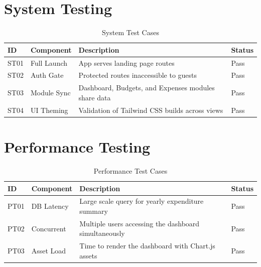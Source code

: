 \section{System Testing}
\begin{longtable}{|l|l|p{4cm}|l|}
\caption{System Test Cases} \\
\hline
\textbf{ID} & \textbf{Component} & \textbf{Description} & \textbf{Status} \\ \hline
ST01 & Full Launch & App serves landing page routes & Pass \\ \hline
ST02 & Auth Gate & Protected routes inaccessible to guests & Pass \\ \hline
ST03 & Module Sync & Dashboard, Budgets, and Expenses modules share data & Pass \\ \hline
ST04 & UI Theming & Validation of Tailwind CSS builds across views & Pass \\ \hline
\end{longtable}

\section{Performance Testing}
\begin{longtable}{|l|l|p{6cm}|l|}
\caption{Performance Test Cases} \\
\hline
\textbf{ID} & \textbf{Component} & \textbf{Description} & \textbf{Status} \\ \hline
PT01 & DB Latency & Large scale query for yearly expenditure summary & Pass \\ \hline
PT02 & Concurrent & Multiple users accessing the dashboard simultaneously & Pass \\ \hline
PT03 & Asset Load & Time to render the dashboard with Chart.js assets & Pass \\ \hline
\end{longtable}
